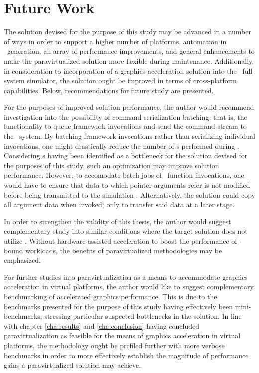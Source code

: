 
\chapter{Future Work}
\label{cha:futurework}
The solution devised for the purpose of this study may be advanced in a number of ways in order to support a higher number of platforms, automation in \dvttermabi\ generation, an array of performance improvements, and general enhancements to make the paravirtualized solution more flexible during maintenance.
Additionally, in consideration to incorporation of a graphics acceleration solution into the \dvttermsimics\ full-system simulator, the solution ought be improved in terms of cross-platform capabilities.
Below, recommendations for future study are presented.

For the purposes of improved solution performance, the author would recommend investigation into the possibility of command serialization batching; that is, the functionality to queue framework invocations and send the command stream to the \dvttermhost\ system.
By batching framework invocations rather than serializing individual invocations, one might drastically reduce the number of \dvttermmagicinstruction s performed during \dvttermparavirtualization .
Considering \dvttermmagicinstruction s having been identified as a bottleneck for the solution devised for the purposes of this study, such an optimization may improve solution performance.
However, to accomodate batch-jobs of \dvttermopenglestwopointo\ function invocations, one would have to ensure that data to which pointer arguments refer is not modified before being transmitted to the simulation \dvttermhost .
Alternatively, the solution could copy all argument data when invoked; only to transfer said data at a later stage.

In order to strengthen the validity of this thesis, the author would suggest complementary study into similar conditions where the target solution does not utilize \dvttermdirectvirtualization .
Without hardware-assisted acceleration to boost the performance of \dvttermcpu -bound workloads, the benefits of paravirtualized methodologies may be emphasized.

For further studies into paravirtualization as a means to accommodate graphics acceleration in virtual platforms, the author would like to suggest complementary benchmarking of accelerated graphics performance.
This is due to the benchmarks presented for the purpose of this study having effectively been mini-benchmarks; stressing particular suspected bottlenecks in the solution.
In line with chapter \ref{cha:results} and \ref{cha:conclusion} having concluded paravirtualization as feasible for the means of graphics acceleration in virtual platforms, the methodology ought be profiled further with more verbose benchmarks in order to more effectively establish the magnitude of performance gains a paravirtualized solution may achieve.

